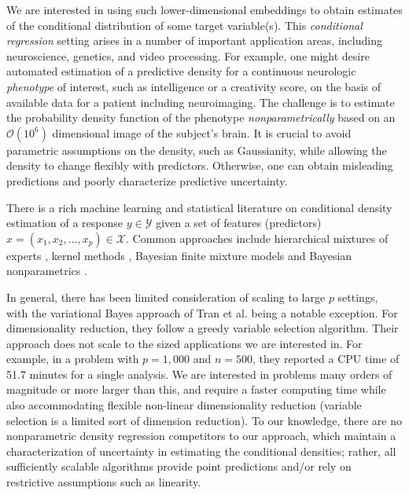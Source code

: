 \documentclass{article}
\begin{document}
We are interested in using such lower-dimensional embeddings to obtain estimates of the conditional distribution of some target variable(s).  This \emph{conditional regression} setting arises in a number of important application areas, including neuroscience, genetics, and video processing.  For example, one might desire automated estimation of a predictive density for a continuous neurologic {\em phenotype} of interest, such as intelligence or a creativity score, on the basis of available data for a patient including neuroimaging.  The challenge is to estimate the probability density function of the phenotype {\em nonparametrically} based on an $\mathcal{O}(10^6)$ dimensional image of the subject's brain.  It is crucial to avoid parametric assumptions on the density, such as Gaussianity, while allowing the density to change flexibly with predictors.  Otherwise, one can obtain misleading predictions and poorly characterize predictive uncertainty.

There is a rich machine learning and statistical literature on conditional density estimation of a response $y \in \mathcal{Y}$ given a set of features (predictors) $x=(x_1, x_2, \ldots, x_p)\in \mathcal{X}$. Common approaches include hierarchical mixtures of experts \cite{mixtureexperts,jiang1999}, kernel methods \cite{fan1996,fanyim2004,holmes2010,fu2011}, Bayesian finite mixture models \cite{nott2012,tran2012,norets2012} and Bayesian nonparametrics 
\cite{griffin06, dunson2007, DunsonPark, chung2009, tokdar2010}.  

In general, there has been limited consideration of scaling to large $p$ settings, with the variational Bayes approach of Tran et al.  being a notable exception. For dimensionality reduction, they follow a greedy variable selection algorithm.  Their approach does not scale to the sized applications we are interested in. For example, in a problem with $p=1,000$ and $n=500$, they reported a CPU time of 51.7 minutes for a single analysis.  We are interested in problems many orders of magnitude or more larger than this, and require a faster computing time while also accommodating flexible non-linear dimensionality reduction (variable selection is a limited sort of dimension reduction).  To our knowledge, there are no nonparametric density regression competitors to our approach, which maintain a characterization of uncertainty in estimating the conditional densities; rather, all sufficiently scalable algorithms provide point predictions and/or rely on restrictive assumptions such as linearity.  
\end{document}
